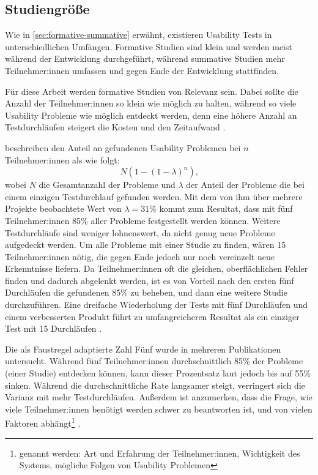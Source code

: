 \subsection{Studiengröße}
\label{sec:study-size}

Wie in \ref{sec:formative-summative} erwähnt, existieren Usability Tests in unterschiedlichen Umfängen. Formative Studien sind klein und werden meist während der Entwicklung durchgeführt, während summative Studien mehr Teilnehmer:innen umfassen und gegen Ende der Entwicklung stattfinden.

Für diese Arbeit werden formative Studien von Relevanz sein. Dabei sollte die Anzahl der Teilnehmer:innen so klein wie möglich zu halten, während so viele Usability Probleme wie möglich entdeckt werden, denn eine höhere Anzahl an Testdurchläufen steigert die Kosten und den Zeitaufwand \parencites{faulknerFiveuserAssumption2003, nielsenWhyYou2000}.

\textcite{nielsenMathematicalModel1993} beschreiben den Anteil an gefundenen Usability Problemen bei
$n$ Teilnehmer:innen als wie folgt:
\begin{equation}
  \label{equ:finding-usability-problems}
  N(1-(1-\lambda{})^n)\text{,}
\end{equation}
wobei $N$ die Gesamtanzahl der Probleme und $\lambda{}$ der Anteil der Probleme die bei einem einzigen Testdurchlauf gefunden werden. Mit dem von ihm über mehrere Projekte beobachtete Wert von $\lambda{}=31\%$ kommt \textcite{nielsenWhyYou2000} zum Resultat, dass mit fünf Teilnehmer:innen 85\% aller Probleme festgestellt werden können. \cite{nielsenWhyYou2000} Weitere Testdurchläufe sind weniger lohnenswert, da nicht genug neue Probleme aufgedeckt werden. Um alle Probleme mit einer Studie zu finden, wären 15 Teilnehmer:innen nötig, die gegen Ende jedoch nur noch vereinzelt neue Erkenntnisse liefern. Da Teilnehmer:innen oft die gleichen, oberflächlichen Fehler finden und dadurch abgelenkt werden, ist es von Vorteil nach den ersten fünf Durchläufen die gefundenen 85\% zu beheben, und dann eine weitere Studie durchzuführen. Eine dreifache Wiederholung der Tests mit fünf Durchläufen und einem verbesserten Produkt führt zu umfangreicheren Resultat als ein einziger Test mit 15 Durchläufen \parencite{nielsenWhyYou2000}.

Die als Faustregel adaptierte Zahl Fünf wurde in mehreren Publikationen untersucht. Während fünf Teilnehmer:innen durchschnittlich 85\% der Probleme (einer Studie) entdecken können, kann dieser Prozentsatz laut \textcite{faulknerFiveuserAssumption2003} jedoch bis auf 55\% sinken. Während die durchschnittliche Rate langsamer steigt, verringert sich die Varianz mit mehr Testdurchläufen. Außerdem ist anzumerken, dass die Frage, wie viele Teilnehmer:innen benötigt werden schwer zu beantworten ist, und von vielen Faktoren abhängt\footnote{genannt werden: Art und Erfahrung der Teilnehmer:innen, Wichtigkeit des Systems, mögliche Folgen von Usability Problemen} \parencite{faulknerFiveuserAssumption2003}.


